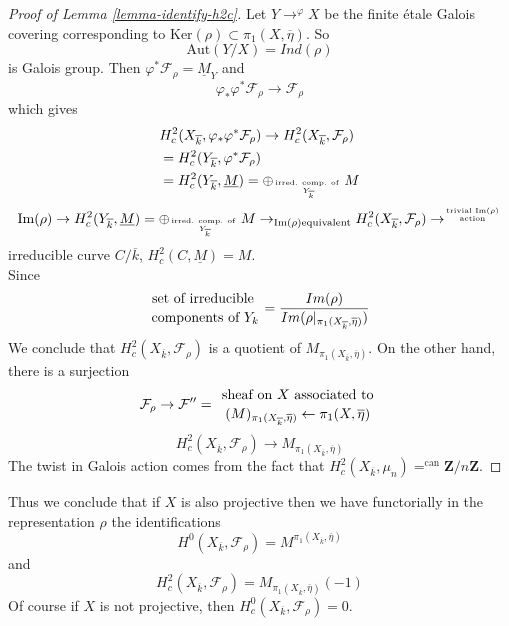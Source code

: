\begin{proof}[Proof of Lemma \ref{lemma-identify-h2c}]
Let $Y\to^{\varphi}X$ be the finite \'etale Galois covering
corresponding to $\text{Ker}(\rho) \subset \pi_1(X, \overline\eta)$. So
$$
\text{Aut}(Y/X)=Ind(\rho)
$$
is Galois group. Then $\varphi^*\mathcal{F}_\rho =\underline M_Y$ and
$$
\varphi_*\varphi^*\mathcal{F}_\rho\to \mathcal{F}_\rho
$$
which gives
\begin{align*}
&H_c^2(X_{\overline k}, \varphi_*\varphi^*\mathcal{F}_\rho) \to
H_c^2(X_{\overline k}, \mathcal{F}_\rho)\\
&=H_c^2(Y_{\overline k}, \varphi^*\mathcal{F}_\rho)\\
&=H_c^2(Y_{\overline k}, \underline M) = \oplus_{\text{irred.
comp. of }\atop Y_{\overline k}}M
\end{align*}
$$
\text{Im}(\rho) \to H_c^2(Y_{\overline k}, \underline M) =
\oplus_{\text{irred. comp. of } \atop Y_{\overline k}}
M \to_{\text{Im}(\rho) \text{equivalent}} H_c^2(X_{\overline k},
\mathcal{F}_{\rho}) \to^{\text{trivial }
\text{Im}(\rho) \atop \text{action}}
$$
irreducible curve $C/\overline k$, $H_c^2(C, \underline M)=M$.
\\
Since
$$
{\text{set of irreducible }\atop\text{components of }Y_k} =
\frac{Im(\rho)}{Im(\rho|_{\pi_1(X_{\overline k}, \overline \eta)})}
$$
We conclude that $H_c^2(X_{\overline k}, \mathcal{F}_\rho)$ is a
quotient of $M_{\pi_1(X_{\overline k}, \overline \eta)}$. On the other hand,
there is a surjection
$$
\mathcal{F}_\rho\to \mathcal{F}'' = {\text{ sheaf on }
X\text{ associated to }\atop (M)_{\pi_1(X_{\overline k}, \overline
\eta)}\leftarrow\pi_1(X, \overline \eta)}
$$
$$
H_c^2(X_{\overline k}, \mathcal{F}_\rho)\to
M_{\pi_1(X_{\overline k}, \overline\eta)}
$$
The twist in Galois action comes from the fact that
$H_c^2(X_{\overline k}, \mu_n)=^{\text{can}} \mathbf{Z}/n\mathbf{Z}$.
\end{proof}

\begin{remark}
\label{remark-projective}
Thus we conclude that if $X$ is also projective then
we have functorially in the representation $\rho$
the identifications
$$
H^0(X_{\overline k}, \mathcal{F}_\rho) =
M^{\pi_1(X_{\overline k}, \overline\eta)}
$$
and
$$
H_c^2(X_{\overline k}, \mathcal{F}_\rho) =
M_{\pi_1(X_{\overline k}, \overline \eta)}(-1)
$$
Of course if $X$ is not projective, then
$H^0_c(X_{\overline{k}}, \mathcal{F}_\rho) = 0$.
\end{remark}


